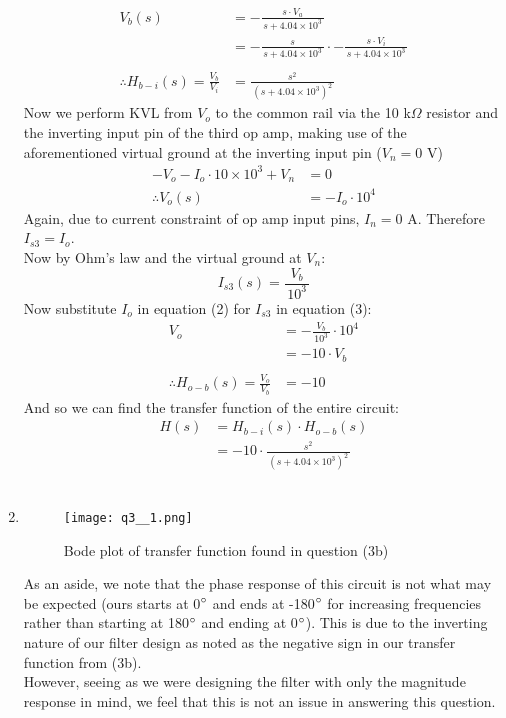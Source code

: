 \begin{enumerate}
{\begin{align*}
			V_b(s) &= -\frac{s \cdot V_a}{\, s + 4.04 \times 10^3 \,} \\
			&= -\frac{s}{\, s + 4.04 \times 10^3 \,} \cdot -\frac{s \cdot V_i}{\, s + 4.04 \times 10^3 \,} \\
			\\
			\therefore H_{b-i}(s) = \frac{V_b}{V_i} &= \frac{s^2}{\, \left(s + 4.04 \times 10^3 \right)^2 \,}
		\end{align*}
		Now we perform KVL from $V_o$ to the common rail via the 10 k$\Omega$ resistor and the inverting input pin of the third op amp, making use of the aforementioned virtual ground at the inverting input pin ($V_n = 0$ V)
		\begin{align}
			-V_o - I_o \cdot 10 \times 10^3 + V_n &= 0 \nonumber \\
			\therefore V_o(s) &= - I_o \cdot 10^4
		\end{align}
		Again, due to current constraint of op amp input pins, $I_n = 0$ A. Therefore $I_{s3} = I_o$. \\
		Now by Ohm's law and the virtual ground at $V_n$:
		\begin{equation}
			I_{s3}(s) = \frac{V_b}{\, 10^3 \,}
		\end{equation}
		Now substitute $I_o$ in equation (2) for $I_{s3}$ in equation (3):
		\begin{align*}
			V_o &= -\frac{V_b}{\, 10^3 \,} \cdot 10^4 \\
			&= -10 \cdot V_b \\
			\\
			\therefore H_{o-b}(s) = \frac{V_o}{V_b} &= -10
		\end{align*}
		And so we can find the transfer function of the entire circuit:
		\begin{align*}
			H(s) &= H_{b-i}(s) \cdot H_{o-b}(s) \\
			&= -10 \cdot \frac{s^2}{\, \left(s + 4.04 \times 10^3 \right)^2 \,}
		\end{align*}
		\\
	}
	
	\item{ 
		\quad 	%
		\begin{figure}[H]
			\centering
			\texttt{[image: q3\_\_1.png]}
			\caption{Bode plot of transfer function found in question (3b)}
		\end{figure}
		As an aside, we note that the phase response of this circuit is not what may be expected (ours starts at 0$\degree$ and ends at -180$\degree$ for increasing frequencies rather than starting at 180$\degree$ and ending at 0$\degree$). This is due to the inverting nature of our filter design as noted as the negative sign in our transfer function from (3b). \\
		However, seeing as we were designing the filter with only the magnitude response in mind, we feel that this is not an issue in answering this question.
		\\
	}
	
\end{enumerate}